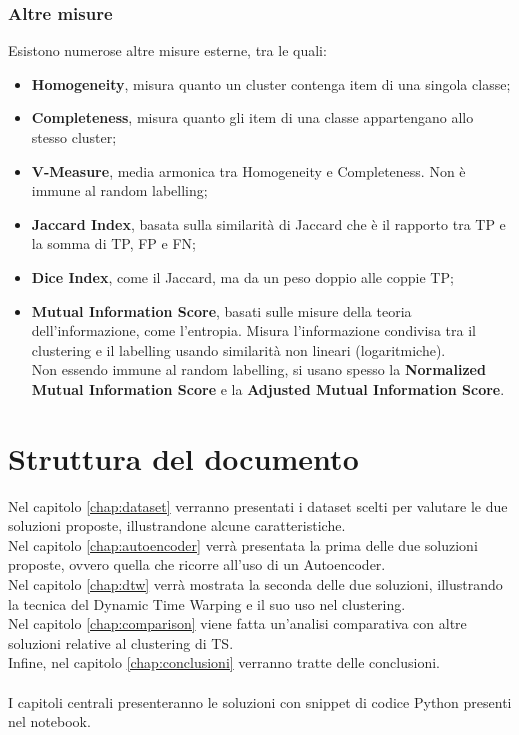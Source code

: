 \subsubsection{Altre misure}
Esistono numerose altre misure esterne, tra le quali:
\begin{itemize}
	\item \textbf{Homogeneity}, misura quanto un cluster contenga item di una singola classe;
	\item \textbf{Completeness}, misura quanto gli item di una classe appartengano allo stesso cluster;
	\item \textbf{V-Measure}, media armonica tra Homogeneity e Completeness. Non è immune al random labelling;
	\item \textbf{Jaccard Index}, basata sulla similarità di Jaccard che è il rapporto tra TP e la somma di TP, FP e FN;
	\item \textbf{Dice Index}, come il Jaccard, ma da un peso doppio alle coppie TP;
	\item \textbf{Mutual Information Score}, basati sulle misure della teoria dell'informazione, come l'entropia. Misura l'informazione condivisa tra il clustering e il labelling usando similarità non lineari (logaritmiche).\\
	Non essendo immune al random labelling, si usano spesso la \textbf{Normalized Mutual Information Score} e la \textbf{Adjusted Mutual Information Score}.
\end{itemize}

\section{Struttura del documento}
Nel capitolo \ref{chap:dataset} verranno presentati i dataset scelti per valutare le due soluzioni proposte, illustrandone alcune caratteristiche.\\
Nel capitolo \ref{chap:autoencoder} verrà presentata la prima delle due soluzioni proposte, ovvero quella che ricorre all'uso di un Autoencoder.\\
Nel capitolo \ref{chap:dtw} verrà mostrata la seconda delle due soluzioni, illustrando la tecnica del Dynamic Time Warping e il suo uso nel clustering.\\
Nel capitolo \ref{chap:comparison} viene fatta un'analisi comparativa con altre soluzioni relative al clustering di TS.\\
Infine, nel capitolo \ref{chap:conclusioni} verranno tratte delle conclusioni.\\
\\
I capitoli centrali presenteranno le soluzioni con snippet di codice Python presenti nel notebook.